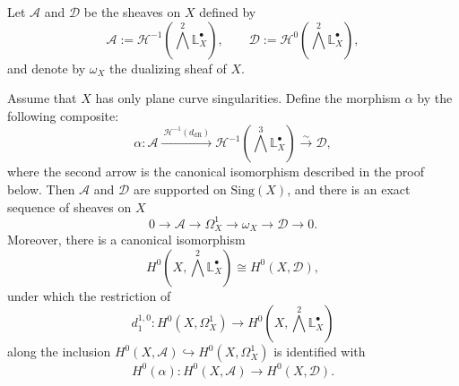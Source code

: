 \documentclass[12pt,reqno]{amsart}
\begin{document}
Let \(\mathcal A\) and \(\mathcal D\) be the sheaves on \(X\) defined by 
\[
\mathcal A:=\mathcal H^{-1}\!\left(\bigwedge^2\mathbb{L}^{\bullet}_X\right),
\qquad
\mathcal D:=\mathcal H^0\!\left(\bigwedge^2\mathbb{L}^{\bullet}_X\right),
\] and denote by \(\omega_X\) the dualizing sheaf of \(X\).

\begin{lemma}\label{lem:plane-d10-comparison}
Assume that \(X\) has only plane curve singularities. Define the morphism \(\alpha\) by the following composite:
\[
\alpha:\mathcal A
\xrightarrow{\ \mathcal H^{-1}(d_{\mathrm{dR}})\ }
\mathcal H^{-1}\!\left(\bigwedge^3\mathbb{L}^{\bullet}_X\right)
\xrightarrow{\sim}
\mathcal D,
\]
where the second arrow is the canonical isomorphism described in the proof below. Then \(\mathcal A\) and \(\mathcal D\) are supported on \(\mathrm{Sing}(X)\), and there is an exact sequence of sheaves on \(X\)
\[
0\to \mathcal A\to \Omega_X^1\to \omega_X\to \mathcal D\to 0.
\]
Moreover, there is a canonical isomorphism
\[
H^0\!\left(X,\bigwedge^2\mathbb{L}^{\bullet}_X\right)\cong H^0(X,\mathcal D),
\]
under which the restriction of
\[
d_1^{1,0}:H^0(X,\Omega_X^1)\to H^0\!\left(X,\bigwedge^2\mathbb{L}^{\bullet}_X\right)
\]
along the inclusion \(H^0(X,\mathcal A)\hookrightarrow H^0(X,\Omega_X^1)\) is identified with
\[
H^0(\alpha):H^0(X,\mathcal A)\to H^0(X,\mathcal D).
\]
\end{lemma}
\end{document}
